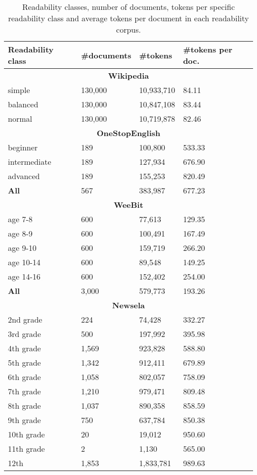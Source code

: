 \documentclass{clv3}
\begin{document}
 \begin{table*}[!ht]
\small
\centering
\caption{Readability classes, number of documents, tokens per specific readability class and average tokens per document in each readability corpus.}
\begin{tabular}{llll}
  Readability class & \#documents & \#tokens & \#tokens per doc.\\\hline
  \multicolumn{4}{c}{\textbf{Wikipedia}}\\\hline
  simple & 130,000 & 10,933,710 & 84.11\\
  balanced & 130,000 & 10,847,108 & 83.44\\
  normal & 130,000 & 10,719,878 & 82.46\\
  \multicolumn{4}{c}{\textbf{OneStopEnglish}}\\\hline
  beginner & 189 & 100,800 & 533.33\\
  intermediate & 189 & 127,934 & 676.90\\
  advanced & 189 & 155,253 & 820.49\\
  \textbf{All} & 567 & 383,987 & 677.23 \\
  \multicolumn{4}{c}{\textbf{WeeBit}}\\\hline
  age 7-8 & 600 & 77,613 & 129.35\\
  age 8-9 & 600 & 100,491 & 167.49\\
  age 9-10 & 600 & 159,719 & 266.20\\
  age 10-14 & 600 & 89,548 & 149.25\\
  age 14-16 & 600 & 152,402 & 254.00\\
  \textbf{All} & 3,000 & 579,773 & 193.26\\
  \multicolumn{4}{c}{\textbf{Newsela}}\\\hline
  2nd grade & 224 & 74,428 & 332.27\\
  3rd grade & 500 & 197,992 & 395.98\\
  4th grade & 1,569 & 923,828 & 588.80\\
  5th grade & 1,342 & 912,411 & 679.89\\
  6th grade & 1,058 & 802,057 & 758.09\\
  7th grade & 1,210 & 979,471 & 809.48\\
  8th grade & 1,037 & 890,358 & 858.59\\
  9th grade & 750 & 637,784 & 850.38\\
  10th grade & 20 & 19,012 & 950.60\\
  11th grade & 2 & 1,130 & 565.00\\
  12th & 1,853 & 1,833,781 & 989.63\\

\end{tabular}
\end{table*}
\end{document}
